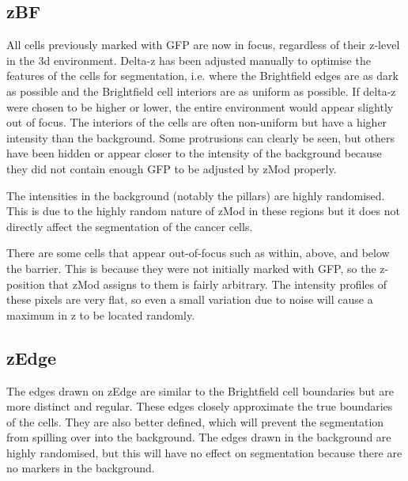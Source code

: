 \subsection{zBF}


All cells previously marked with GFP are now in focus, regardless of their z-level in the 3d environment. Delta-z has been adjusted manually to optimise the features of the cells for segmentation, i.e. where the Brightfield edges are as dark as possible and the Brightfield cell interiors are as uniform as possible. If delta-z were chosen to be higher or lower, the entire environment would appear slightly out of focus. The interiors of the cells are often non-uniform but have a higher intensity than the background. Some protrusions can clearly be seen, but others have been hidden or appear closer to the intensity of the background because they did not contain enough GFP to be adjusted by zMod properly.

The intensities in the background (notably the pillars) are highly randomised. This is due to the highly random nature of zMod in these regions but it does not directly affect the segmentation of the cancer cells.

There are some cells that appear out-of-focus such as within, above, and below the barrier. This is because they were not initially marked with GFP, so the z-position that zMod assigns to them is fairly arbitrary. The intensity profiles of these pixels are very flat, so even a small variation due to noise will cause a maximum in z to be located randomly.

\subsection{zEdge}


The edges drawn on zEdge are similar to the Brightfield cell boundaries but are more distinct and regular. These edges closely approximate the true boundaries of the cells. They are also better defined, which will prevent the segmentation from spilling over into the background. The edges drawn in the background are highly randomised, but this will have no effect on segmentation because there are no markers in the background.

